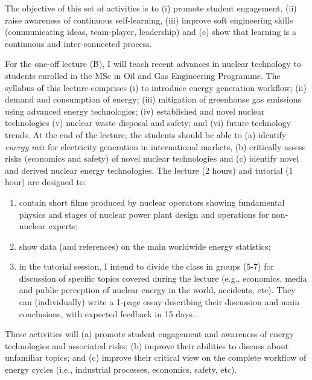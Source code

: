 \documentclass[14pt,twoside]{article}
\begin{document}
The objective of this set of activities is to (i) promote student engagement, (ii) raise awareness of continuous self-learning, (iii) improve soft engineering skills (communicating ideas, team-player, leadership) and (c) show that learning is a continuous and inter-connected process.
\medskip

For the one-off lecture (B), I will teach recent advances in nuclear technology to students enrolled in the MSc in Oil and Gas Engineering Programme. The syllabus of this lecture comprises (i) to introduce energy generation workflow; (ii) demand and consumption of energy; (iii) mitigation of greenhouse gas emissions using advanced energy technologies; (iv) established and novel nuclear technologies (v) nuclear waste disposal and safety; and (vi) future technology trends. At the end of the lecture, the students should be able to (a) identify {\it energy mix} for electricity generation in international markets, (b) critically assess risks (economics and safety) of novel nuclear technologies and (c) identify novel and derived nuclear energy technologies. The lecture (2 hours) and tutorial (1 hour) are designed to:
\begin{enumerate}
\item contain short films produced by nuclear operators showing fundamental physics and stages of nuclear power plant design and operations for non-nuclear experts;
\item show data (and references) on the main worldwide energy statistics;
\item in the tutorial session, I intend to divide the class in groups (5-7) for discussion of specific topics covered during the lecture (e.g., economics, media and public perception of nuclear energy in the world, accidents, etc). They can (individually) write a 1-page essay describing their discussion and main conclusions, with expected feedback in 15 days.
\end{enumerate}  
These activities will (a) promote student engagement and awareness of energy technologies and associated risks; (b) improve their abilities to discuss about unfamiliar topics; and (c) improve their critical view on the complete workflow of energy cycles (i.e., industrial processes, economics, safety, etc).   
\end{document}
